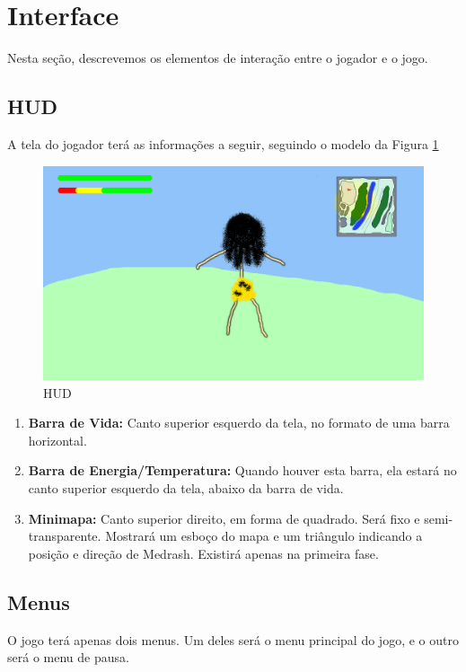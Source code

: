 \section{Interface}

Nesta seção, descrevemos os elementos de interação entre o jogador e o
jogo.

\subsection{HUD}

A tela do jogador terá as informações a seguir, seguindo o modelo da
Figura \ref{fig:hud}
\begin{figure}[!ht]
 \centering
 \includegraphics[scale=0.39]{hud.png}
 \caption{HUD}
 \label{fig:hud}
\end{figure}
\begin{enumerate}
 \item {\bf Barra de Vida:} Canto superior esquerdo da tela, no 
formato de uma barra horizontal. 
 \item {\bf Barra de Energia/Temperatura:} Quando houver esta barra,
ela estará no canto superior esquerdo da tela,
abaixo da barra de vida.
 \item {\bf Minimapa:} Canto superior direito, em forma de quadrado.
Será fixo e semi-transparente. Mostrará um esboço do mapa e um triângulo
indicando a posição e direção de Medrash. Existirá apenas na primeira fase.
\end{enumerate}

\subsection{Menus}

O jogo terá apenas dois menus. Um deles será o menu principal do jogo, e o 
outro será o menu de pausa.

